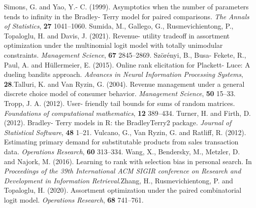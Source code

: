 Simons, G. and Yao, Y.- C. (1999). Asymptotics when the number of
parameters tends to infinity in the Bradley- Terry model for paired
comparisons. \emph{The Annals of Statistics}, \textbf{27} 1041--1060.
Sumida, M., Gallego, G., Rusmevichientong, P., Topaloglu, H. and Davis,
J. (2021). Revenue- utility tradeoff in assortment optimization under
the multinomial logit model with totally unimodular constraints.
\emph{Management Science}, \textbf{67} 2845--2869. Szörényi, B., Busa-
Fekete, R., Paul, A. and Hüllermeier, E. (2015). Online rank elicitation
for Plackett- Luce: A dueling bandits approach. \emph{Advances in Neural
Information Processing Systems}, \textbf{28}.Talluri, K. and Van Ryzin,
G. (2004). Revenue management under a general discrete choice model of
consumer behavior. \emph{Management Science}, \textbf{50} 15--33. Tropp,
J. A. (2012). User- friendly tail bounds for sums of random matrices.
\emph{Foundations of computational mathematics}, \textbf{12} 389--434.
Turner, H. and Firth, D. (2012). Bradley- Terry models in R: the
BradleyTerry2 package. \emph{Journal of Statistical Software},
\textbf{48} 1--21. Vulcano, G., Van Ryzin, G. and Ratliff, R. (2012).
Estimating primary demand for substitutable products from sales
transaction data. \emph{Operations Research}, \textbf{60} 313--334.
Wang, X., Bendersky, M., Metzler, D. and Najork, M. (2016). Learning to
rank with selection bias in personal search. In \emph{Proceedings of the
39th International ACM SIGIR conference on Research and Development in
Information Retrieval}.Zhang, H., Rusmevichientong, P. and Topaloglu, H.
(2020). Assortment optimization under the paired combinatorial logit
model. \emph{Operations Research}, \textbf{68} 741--761.





